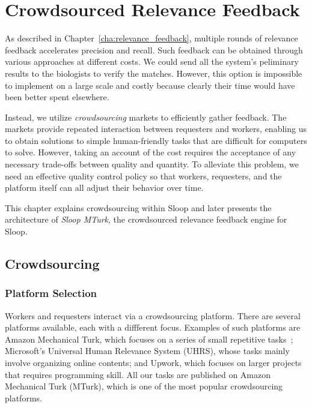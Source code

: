 \graphicspath{{images/chap5/}}
\chapter{Crowdsourced Relevance Feedback}
\label{cha:sloop_mturk}

As described in Chapter~\ref{cha:relevance_feedback}, multiple rounds of
relevance feedback accelerates precision and recall. Such feedback can be 
obtained through various approaches at different costs. We could send all
the system's peliminary results to the biologists to verify the matches.
However, this option is impossible to implement on a large scale and costly
because clearly their time would have been better spent elsewhere.

Instead, we utilize \emph{crowdsourcing} markets to efficiently gather
feedback. The markets provide repeated interaction between requesters and
workers, enabling us to obtain solutions to simple human-friendly tasks that
are difficult for computers to solve. However, taking an account of the cost
requires the acceptance of any necessary trade-offs between quality and
quantity. To alleviate this problem, we need an
effective quality control policy so that workers, requesters, and the platform
itself can all adjust their behavior over time. 

This chapter explains crowdsourcing within Sloop and later presents the
architecture of \emph{Sloop MTurk}, the crowdsourced relevance feedback engine
for Sloop.

\section{Crowdsourcing} %
\label{sec:crowdsourcing}

  \subsection{Platform Selection}

  Workers and requesters interact via a crowdsourcing platform. There are several 
  platforms available, each with a diffferent focus. Examples of such
  platforms are 
  Amazon Mechanical Turk, which focuses on a series of small repetitive
  tasks~\cite{sliv14}; Microsoft's Universal Human Relevance System (UHRS),
  whose tasks mainly involve organizing online contents;
  and Upwork, which focuses on larger projects that requires programming skill.
  All our tasks are published on Amazon Mechanical Turk (MTurk), which is one of the most
  popular crowdsourcing platforms.

